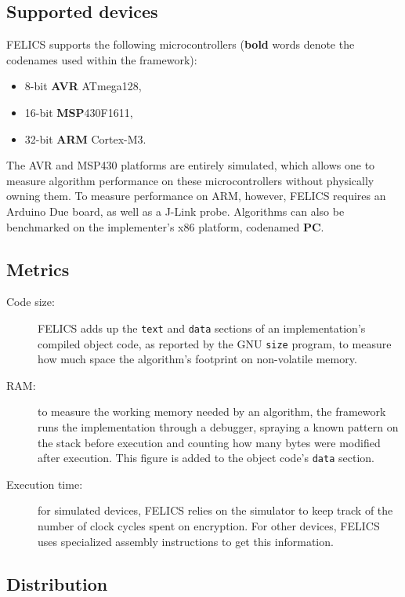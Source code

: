 \documentclass{article}
\begin{document}
\subsection{Supported devices}
\label{sec:felics/devices}

FELICS supports the following microcontrollers (\textbf{bold} words
denote the codenames used within the framework):

\begin{itemize}
\item 8-bit \textbf{AVR} ATmega128,
\item 16-bit \textbf{MSP}430F1611,
\item 32-bit \textbf{ARM} Cortex-M3.
\end{itemize}

The AVR and MSP430 platforms are entirely simulated, which allows one
to measure algorithm performance on these microcontrollers without
physically owning them.  To measure performance on ARM, however,
FELICS requires an Arduino Due board, as well as a J-Link probe.
Algorithms can also be benchmarked on the implementer's x86 platform,
codenamed \textbf{PC}.

\subsection{Metrics}
\label{sec:felics/metrics}

\begin{description}
\item[Code size:] FELICS adds up the \texttt{text} and \texttt{data}
  sections of an implementation's compiled object code, as reported by
  the GNU \texttt{size} program, to measure how much space the
  algorithm's footprint on non-volatile memory.

\item[RAM:] to measure the working memory needed by an algorithm, the
  framework runs the implementation through a debugger, spraying a
  known pattern on the stack before execution and counting how many
  bytes were modified after execution.  This figure is added to the
  object code's \texttt{data} section.

\item[Execution time:] for simulated devices, FELICS relies on the
  simulator to keep track of the number of clock cycles spent on
  encryption.  For other devices, FELICS uses specialized assembly
  instructions to get this information.
\end{description}
\subsection{Distribution}
\label{sec:felics/dist}
\end{document}
